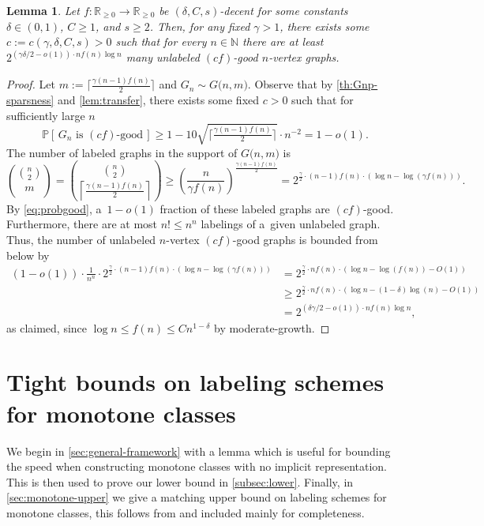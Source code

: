 \documentclass[letterpaper,11pt]{article}
\newcommand{\dec}{decent\xspace}
\newcommand{\Slin}{moderate-growth\xspace}
\newcommand{\Nn}{\mathbb{N}}
\newcommand{\Rrr}{\mathbb{R}_{\geq 0}}
\newtheorem{lemma}[theorem]{Lemma}
\theoremstyle{definition}
\theoremstyle{remark}
\renewcommand{\leq}{\leqslant}
\renewcommand{\geq}{\geqslant}
\renewcommand{\Pr}[1]{\mathbb{P}\left[\,#1\,\right]}
\begin{document}
 	\begin{lemma}\label{lem:superfactorial}
				Let $f : \Rrr \rightarrow \Rrr$ be $(\delta,C,s)$-\dec  for some constants $\delta \in (0,1)$, $C\geq 1$, and $s\geq 2$.   
 		Then, for any fixed $\gamma>1$, there exists some $c:=c(\gamma,\delta,C,s)>0$ such that for every $n \in \Nn$ there are at least  
 		$ 2^{(\gamma \delta/2-o(1))\cdot nf(n)\log n}$ many unlabeled $(cf)$-good $n$-vertex graphs.
 	\end{lemma} 
 	\begin{proof}Let $m:= \big\lceil \tfrac{\gamma(n-1)f(n)}{2}\big\rceil$ and $G_n \sim G\big(n,m \big)$. Observe that by \cref{th:Gnp-sparsness} and \cref{lem:transfer}, there exists some fixed $c >0$ such that for sufficiently large $n$   
 		\begin{equation}\label{eq:probgood}
 			\Pr{G_n\text{ is $(cf)$-good}} \geq 1-10 \sqrt{\big\lceil \tfrac{\gamma(n-1)f(n)}{2}\big\rceil}\cdot n^{-2} = 1-o(1).
 		\end{equation}
                The number of labeled graphs in the support of $G\big(n,m\big)$ is \[\binom{\binom{n}{2}}{m}=\binom{\binom{n}{2}}{\left\lceil \tfrac{\gamma (n-1)f(n)}{2}\right\rceil }\geq\left(\frac{n}{\gamma  f(n)}\right)^{\tfrac{\gamma (n-1)f(n)}{2}} =  2^{\frac{\gamma }{2}\cdot (n-1)f(n) \cdot (\log n  - \log (\gamma f(n)))} . \]
                            By \eqref{eq:probgood}, a~$1-o(1)$ fraction of these labeled graphs are $(cf)$-good.
 	Furthermore, there are at most $n!\leq n^n$ labelings of a~given unlabeled graph. Thus, the number of unlabeled $n$-vertex  $(cf)$-good graphs is bounded from below by
 	\begin{align*}  (1-o(1))\cdot \frac{1}{n^n}\cdot  2^{\frac{\gamma }{2}\cdot (n-1)f(n)\cdot (\log n  - \log (\gamma f(n)))} &=    2^{\frac{\gamma }{2}\cdot nf(n)\cdot (\log n  - \log (  f(n)) - O(1))}\\  
 		&\geq    2^{\frac{\gamma }{2}\cdot nf(n)\cdot (\log n  - (1-\delta) \log(n) - O(1))}\\  
&=  		2^{(\delta \gamma /2-o(1))\cdot n f(n) \log n},
 	        \end{align*}as claimed, since $\log n \leq f(n)\leq Cn^{1-\delta} $ by \Slin. 
 \end{proof}


 
 	\section{Tight bounds on labeling schemes for monotone classes}
 	\label{sec:monotone}
 We begin in \cref{sec:general-framework} with a lemma which is useful for bounding the speed when constructing monotone classes with no implicit representation. This is then used to prove our lower bound in \cref{subsec:lower}. Finally, in \cref{sec:monotone-upper} we give a matching upper bound on labeling schemes for monotone classes, this follows from \cite{KNR92} and included mainly for completeness. 
\end{document}
